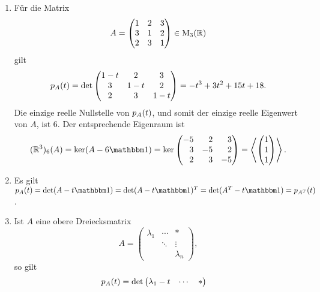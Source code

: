 \begin{example}
  \leavevmode
  \begin{enumerate}
    \item
      Für die Matrix
      \[
          A
        = \begin{pmatrix}
            1 & 2 & 3 \\
            3 & 1 & 2 \\
            2 & 3 & 1
          \end{pmatrix}
        \in \operatorname{M}_{3}(\mathbb{R})
      \]
      gilt
      \[
          p_{A}(t)
        = \det
          \begin{pmatrix}
            1-t & 2   & 3   \\
            3   & 1-t & 2   \\
            2   & 3   & 1-t
          \end{pmatrix}
        = -t^3 + 3t^2 + 15t + 18.
      \]
      Die einzige reelle Nullstelle von $p_{A}(t)$, und somit der einzige reelle Eigenwert von $A$, ist $6$.
      Der entsprechende Eigenraum ist
      \[
          \eigenspace{(\Real^3)}{A}{6}
        = \ker (A - 6 \Id)
        = \ker \begin{pmatrix*}[r]
                -5  &  2  &  3 \\
                 3  & -5  &  2 \\
                 2  &  3  & -5
              \end{pmatrix*}
        = \generated{ \vect{1 \\ 1 \\ 1} }.
      \]
    \item
      Es gilt
      $
          \charpol{A}(t)
        = \det (A - t \Id)
        = \det \transpose{(A - t \Id)}
        = \det (\transpose{A} - t \Id)
        = \charpol{\transpose{A}}(t)
      $.
    \item
      Ist $A$ eine obere Dreiecksmatrix
      \[
          A
        = \begin{pmatrix}
            \lambda_1 & \cdots  & *         \\
                      & \ddots  & \vdots    \\
                      &         & \lambda_n
          \end{pmatrix},
      \]
      so gilt
      \begin{align*}
            p_{A}(t)
        &=  \det
            \begin{pmatrix}
              \lambda_1 - t & \cdots  & *             \\

\end{pmatrix}
\end{align*}
\end{enumerate}
\end{example}
